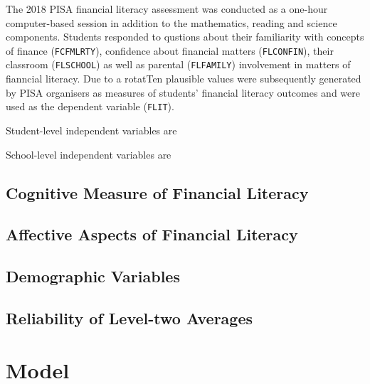 \documentclass[a4paper,11pt,UKenglish,twoside,openright]{report}\usepackage[]{graphicx}\usepackage[]{color}
\begin{document}
The 2018 PISA financial literacy assessment was conducted as a one-hour computer-based session in addition to the mathematics, reading and science components. Students responded to qustions about their familiarity with concepts of finance (\texttt{FCFMLRTY}), confidence about financial matters (\texttt{FLCONFIN}), their classroom (\texttt{FLSCHOOL}) as well as parental (\texttt{FLFAMILY}) involvement in matters of fianncial literacy. Due to a rotatTen plausible values were subsequently generated by PISA organisers as measures of students' financial literacy outcomes and were used as the dependent variable (\texttt{FLIT}).

Student-level independent variables are

School-level independent variables are

\subsection{Cognitive Measure of Financial Literacy}

\subsection{Affective Aspects of Financial Literacy}

\subsection{Demographic Variables}

\subsection{Reliability of Level-two Averages}

\section{Model}
\end{document}
